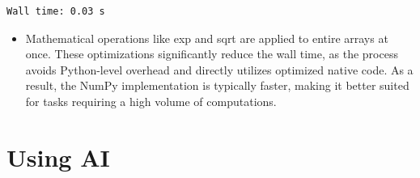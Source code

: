 \documentclass[
  letterpaper,
  DIV=11,
  numbers=noendperiod]{scrreprt}
\providecommand{\tightlist}{%
  \setlength{\itemsep}{0pt}\setlength{\parskip}{0pt}}\usepackage{longtable,booktabs,array}
\begin{document}
\begin{verbatim}
Wall time: 0.03 s
\end{verbatim}

\begin{itemize}
\tightlist
\item
  Mathematical operations like exp and sqrt are applied to entire arrays
  at once. These optimizations significantly reduce the wall time, as
  the process avoids Python-level overhead and directly utilizes
  optimized native code. As a result, the NumPy implementation is
  typically faster, making it better suited for tasks requiring a high
  volume of computations.
\end{itemize}


\chapter{Using AI}\label{using-ai-1}
\end{document}
